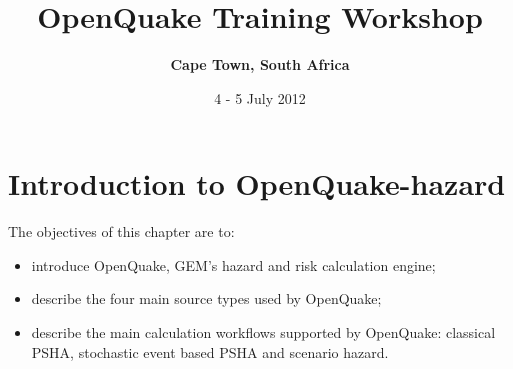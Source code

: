 \documentclass[11pt,a4paper,headings=small,dvips]{scrbook}
\newenvironment{myfancybox}{%
  \def\FrameCommand{\fboxsep=\FrameSep \fcolorbox{blue01}{honeydew}}%
  \color{black}\MakeFramed {\FrameRestore}}%
 {\endMakeFramed}
\begin{document}
\setcounter{page}{1}

\begin{titlepage}
	\title{ \textcolor{blue01}{\textsf{\bfseries\Huge 
        OpenQuake Training Workshop\\
        }}}
	\subtitle{ \textcolor{blue01}{\textsf{\bfseries\LARGE
        Cape Town, South Africa}}}
	\date{4 - 5 July 2012}
 
	\publishers{GEM Foundation, Pavia}
\end{titlepage}
\pagestyle{scrheadings}
\maketitle
\clearpage
\tableofcontents
\cleardoublepage
\chapter{Introduction to OpenQuake-hazard}
\begin{myfancybox}
The objectives of this chapter are to:
\begin{itemize}
    \item introduce OpenQuake, GEM's hazard and risk calculation engine;
    \item describe the four main source types used by OpenQuake;
    \item describe the main calculation workflows supported by OpenQuake: 
        classical PSHA, stochastic event based PSHA and scenario hazard.
\end{itemize}
\end{myfancybox}
    
\end{document}
